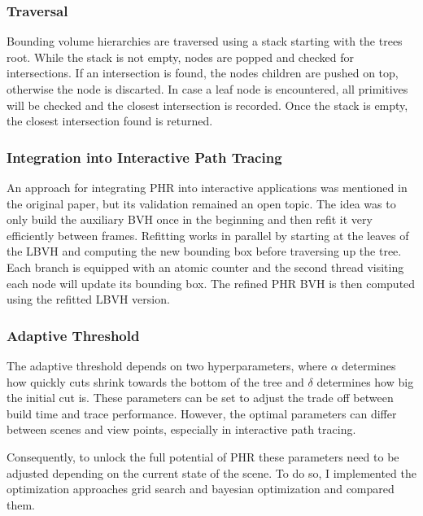 \subsubsection{Traversal}
\label{traversal}
Bounding volume hierarchies are traversed using a stack starting with the trees root. While the stack is not empty, nodes are popped and checked for intersections. If an intersection is found, the nodes children are pushed on top, otherwise the node is discarted. In case a leaf node is encountered, all primitives will be checked and the closest intersection is recorded. Once the stack is empty, the closest intersection found is returned. 

\subsubsection{Integration into Interactive Path Tracing}
An approach for integrating PHR into interactive applications was mentioned in the original paper\cite{hendrich_parallel_2017}, but its validation remained an open topic. The idea was to only build the auxiliary BVH once in the beginning and then refit it very efficiently between frames. Refitting works in parallel by starting at the leaves of the LBVH and computing the new bounding box before traversing up the tree. Each branch is equipped with an atomic counter and the second thread visiting each node will update its bounding box. The refined PHR BVH is then computed using the refitted LBVH version. 

\subsubsection{Adaptive Threshold}
\label{adaptive threshold}
The adaptive threshold depends on two hyperparameters, where $\alpha$ determines how quickly cuts shrink towards the bottom of the tree and $\delta$ determines how big the initial cut is. These parameters can be set to adjust the trade off between build time and trace performance. However, the optimal parameters can differ between scenes and view points, especially in interactive path tracing. 



Consequently, to unlock the full potential of PHR these parameters need to be adjusted depending on the current state of the scene. To do so, I implemented the optimization approaches grid search and bayesian optimization and compared them.

